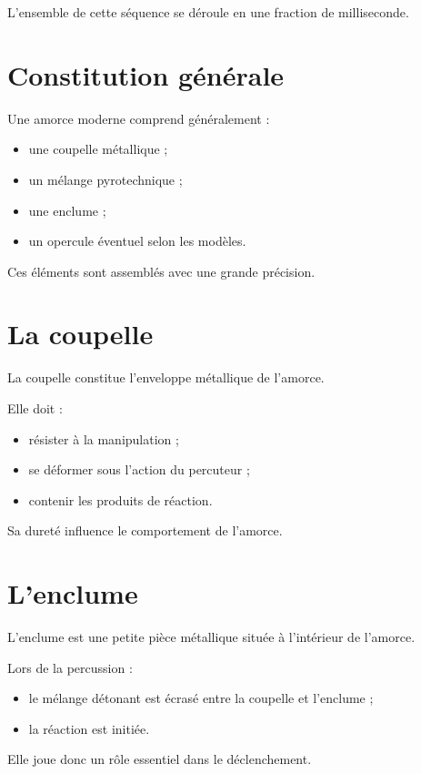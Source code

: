 L'ensemble de cette séquence se déroule en une fraction de milliseconde.

\section{Constitution générale}

Une amorce moderne comprend généralement :

\begin{itemize}
    \item une coupelle métallique ;
    \item un mélange pyrotechnique ;
    \item une enclume ;
    \item un opercule éventuel selon les modèles.
\end{itemize}

Ces éléments sont assemblés avec une grande précision.

\section{La coupelle}

La coupelle constitue l'enveloppe métallique de l'amorce.

Elle doit :

\begin{itemize}
    \item résister à la manipulation ;
    \item se déformer sous l'action du percuteur ;
    \item contenir les produits de réaction.
\end{itemize}

Sa dureté influence le comportement de l'amorce.

\section{L'enclume}

L'enclume est une petite pièce métallique située à l'intérieur de l'amorce.

Lors de la percussion :

\begin{itemize}
    \item le mélange détonant est écrasé entre la coupelle et l'enclume ;
    \item la réaction est initiée.
\end{itemize}

Elle joue donc un rôle essentiel dans le déclenchement.

